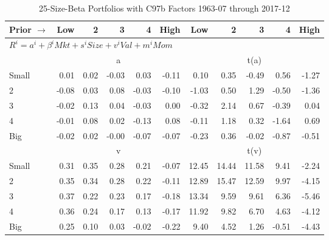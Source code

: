 
\begin{table}[!ht]
\footnotesize
\centering
\caption{25-Size-Beta Portfolios with C97b Factors 1963-07 through 2017-12}
\begin{tabular}{lrrrrrrrrrr}
  \toprule
    Prior $\rightarrow$ & Low & 2 & 3 & 4 & High & Low & 2 & 3 & 4 & High \\ 
  \midrule
  \multicolumn{11}{l}{$R^i=a^i+\beta^iMkt+s^iSize+v^iVal+m^iMom$} \\

  
    
      & \multicolumn{5}{c}{a} & \multicolumn{5}{c}{t(a)}
    
    \\
      \cmidrule(r){2-6} \cmidrule(r){7-11}

    Small   & 0.01  & 0.02  & -0.03  & 0.03  & -0.11  & 0.10  & 0.35  & -0.49  & 0.56  & -1.27  \\
         2  & -0.08  & 0.03  & 0.08  & -0.03  & -0.10  & -1.03  & 0.50  & 1.29  & -0.50  & -1.36  \\
         3  & -0.02  & 0.13  & 0.04  & -0.03  & 0.00  & -0.32  & 2.14  & 0.67  & -0.39  & 0.04  \\
         4  & -0.01  & 0.08  & 0.02  & -0.13  & 0.08  & -0.11  & 1.18  & 0.32  & -1.64  & 0.69  \\
    Big     & -0.02  & 0.02  & -0.00  & -0.07  & -0.07  & -0.23  & 0.36  & -0.02  & -0.87  & -0.51  \\

  
    
      & \multicolumn{5}{c}{v} & \multicolumn{5}{c}{t(v)}
    
    \\
      \cmidrule(r){2-6} \cmidrule(r){7-11}

    Small   & 0.31  & 0.35  & 0.28  & 0.21  & -0.07  & 12.45  & 14.44  & 11.58  & 9.41  & -2.24  \\
         2  & 0.35  & 0.34  & 0.28  & 0.22  & -0.11  & 12.89  & 15.47  & 12.59  & 9.97  & -4.15  \\
         3  & 0.37  & 0.22  & 0.23  & 0.17  & -0.18  & 13.34  & 9.59  & 9.61  & 6.36  & -5.46  \\
         4  & 0.36  & 0.24  & 0.17  & 0.13  & -0.17  & 11.92  & 9.82  & 6.70  & 4.63  & -4.12  \\
    Big     & 0.25  & 0.10  & 0.03  & -0.02  & -0.22  & 9.40  & 4.52  & 1.26  & -0.51  & -4.43  \\

  
    

\end{tabular}
\end{table}
